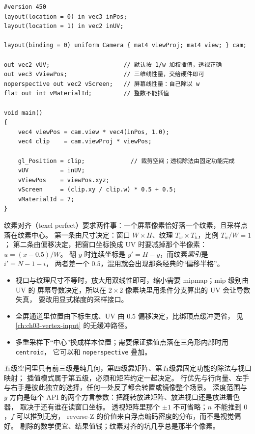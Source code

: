\documentclass[12pt,a4paper,fontset=fandol]{ctexbook}
\newcommand{\Tp}[1]{\texttt{#1}}
\begin{document}
\begin{lstlisting}[style=glslstyle,caption={顶点变换：gl\_Position 与插值模式的显式选择},label={lst:ch04-glsl-xform}]
#version 450
layout(location = 0) in vec3 inPos;
layout(location = 1) in vec2 inUV;

layout(binding = 0) uniform Camera { mat4 viewProj; mat4 view; } cam;

out vec2 vUV;                     // 默认按 1/w 加权插值，透视正确
out vec3 vViewPos;                // 三维线性量，交给硬件即可
noperspective out vec2 vScreen;   // 屏幕线性量：自己除以 w
flat out int vMaterialId;         // 整数不能插值

void main()
{
    vec4 viewPos = cam.view * vec4(inPos, 1.0);
    vec4 clip    = cam.viewProj * viewPos;

    gl_Position = clip;             // 裁剪空间；透视除法由固定功能完成
    vUV         = inUV;
    vViewPos    = viewPos.xyz;
    vScreen     = (clip.xy / clip.w) * 0.5 + 0.5;
    vMaterialId = 7;
}
\end{lstlisting}

纹素对齐（texel perfect）要求两件事：一个屏幕像素恰好落一个纹素，且采样点落在纹素中心。
第一条由尺寸决定：窗口 $W \times H$、纹理 $T_w \times T_h$，比例 $T_w/W = 1$；
第二条由偏移决定，把窗口坐标换成 UV 时要减掉那个半像素：$u = (x - 0.5)/W$。
翻 $y$ 时连续坐标是 $y' = H - y$，而纹素\emph{索引}是 $i' = N - 1 - i$，
两者差一个 $0.5$，混用就会出现那条经典的``偏移半格''。

\begin{itemize}
  \item 视口与纹理尺寸不等时，放大用双线性即可，缩小需要 mipmap；mip 级别由 UV 的
        屏幕导数决定，所以在 $2 \times 2$ 像素块里用条件分支算出的 UV 会让导数失真，
        要改用显式梯度的采样接口。
  \item 全屏通道里位置由下标生成、UV 由 $0.5$ 偏移决定，比绑顶点缓冲更省，
        见 \ref{ch:ch03-vertex-input} 的无缓冲路径。
  \item 多重采样下``中心''换成样本位置；需要保证插值点落在三角形内部时用 \Tp{centroid}，
        它可以和 \Tp{noperspective} 叠加。
\end{itemize}

\begin{guideline}[title={本章要点}]
  五级空间里只有前三级是纯几何，第四级靠矩阵、第五级靠固定功能的除法与视口映射；
  插值模式属于第五级，必须和矩阵约定一起决定。
  行优先与行向量、左手与右手是彼此独立的选择，任何一处反了都会转置或镜像整个场景。
  深度范围与 $y$ 方向是每个 API 的两个方言参数：把翻转放进矩阵、放进视口还是放进着色器，
  取决于还有谁在读窗口坐标。
  透视矩阵里那个 $\pm 1$ 不可省略；$n$ 不能推到 $0$，$f$ 可以推到无穷，
  reverse-Z 的价值来自浮点编码密度的分布，而不是视觉偏好。
  剔除的数学便宜、结果值钱；纹素对齐的坑几乎总是那半个像素。
\end{guideline}
\end{document}
